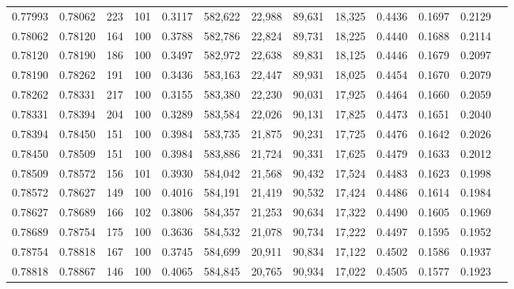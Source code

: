 \begin{tabular}{rrrrrrrrrrrrr}
0.77993 & 0.78062 &   223 & 101 &                                     0.3117 & 582,622 &  22,988 &  89,631 &  18,325 & 0.4436 & 0.1697 & 0.2129 \\
0.78062 & 0.78120 &   164 & 100 &                                     0.3788 & 582,786 &  22,824 &  89,731 &  18,225 & 0.4440 & 0.1688 & 0.2114 \\
0.78120 & 0.78190 &   186 & 100 &                                     0.3497 & 582,972 &  22,638 &  89,831 &  18,125 & 0.4446 & 0.1679 & 0.2097 \\
0.78190 & 0.78262 &   191 & 100 &                                     0.3436 & 583,163 &  22,447 &  89,931 &  18,025 & 0.4454 & 0.1670 & 0.2079 \\
0.78262 & 0.78331 &   217 & 100 &                                     0.3155 & 583,380 &  22,230 &  90,031 &  17,925 & 0.4464 & 0.1660 & 0.2059 \\
0.78331 & 0.78394 &   204 & 100 &                                     0.3289 & 583,584 &  22,026 &  90,131 &  17,825 & 0.4473 & 0.1651 & 0.2040 \\
0.78394 & 0.78450 &   151 & 100 &                                     0.3984 & 583,735 &  21,875 &  90,231 &  17,725 & 0.4476 & 0.1642 & 0.2026 \\
0.78450 & 0.78509 &   151 & 100 &                                     0.3984 & 583,886 &  21,724 &  90,331 &  17,625 & 0.4479 & 0.1633 & 0.2012 \\
0.78509 & 0.78572 &   156 & 101 &                                     0.3930 & 584,042 &  21,568 &  90,432 &  17,524 & 0.4483 & 0.1623 & 0.1998 \\
0.78572 & 0.78627 &   149 & 100 &                                     0.4016 & 584,191 &  21,419 &  90,532 &  17,424 & 0.4486 & 0.1614 & 0.1984 \\
0.78627 & 0.78689 &   166 & 102 &                                     0.3806 & 584,357 &  21,253 &  90,634 &  17,322 & 0.4490 & 0.1605 & 0.1969 \\
0.78689 & 0.78754 &   175 & 100 &                                     0.3636 & 584,532 &  21,078 &  90,734 &  17,222 & 0.4497 & 0.1595 & 0.1952 \\
0.78754 & 0.78818 &   167 & 100 &                                     0.3745 & 584,699 &  20,911 &  90,834 &  17,122 & 0.4502 & 0.1586 & 0.1937 \\
0.78818 & 0.78867 &   146 & 100 &                                     0.4065 & 584,845 &  20,765 &  90,934 &  17,022 & 0.4505 & 0.1577 & 0.1923 \\

\end{tabular}
